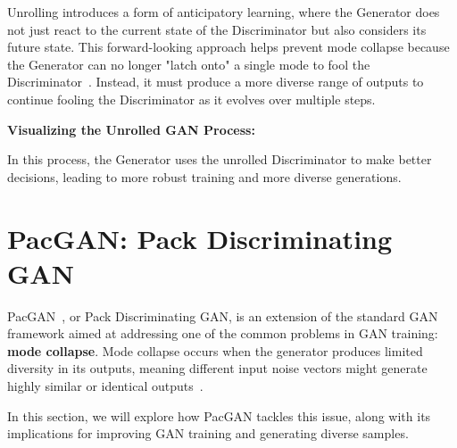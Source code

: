 Unrolling introduces a form of anticipatory learning, where the Generator does not just react to the current state of the Discriminator but also considers its future state. This forward-looking approach helps prevent mode collapse because the Generator can no longer "latch onto" a single mode to fool the Discriminator~\cite{wang2022unrolled}. Instead, it must produce a more diverse range of outputs to continue fooling the Discriminator as it evolves over multiple steps.

\textbf{Visualizing the Unrolled GAN Process:}

\begin{center}
\end{center}

In this process, the Generator uses the unrolled Discriminator to make better decisions, leading to more robust training and more diverse generations.










\section{PacGAN: Pack Discriminating GAN}
PacGAN~\cite{lin2018pacgan}, or Pack Discriminating GAN, is an extension of the standard GAN framework aimed at addressing one of the common problems in GAN training: \textbf{mode collapse}. Mode collapse occurs when the generator produces limited diversity in its outputs, meaning different input noise vectors might generate highly similar or identical outputs~\cite{dou2023machine}.

In this section, we will explore how PacGAN tackles this issue, along with its implications for improving GAN training and generating diverse samples.

